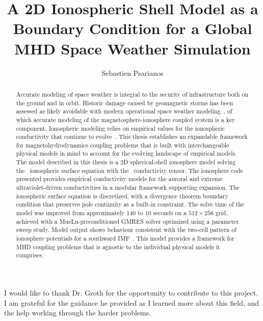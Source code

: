 \documentclass{ut-thesis-custom}
\author{Sebastien Psarianos}
\title{A 2D Ionospheric Shell Model as a Boundary Condition
       for a Global MHD Space Weather Simulation}
\begin{document}
\frontmatter
\maketitle
\begin{abstract}

	Accurate modeling of space weather is integral to the security of infrastructure both on the ground and in orbit. Historic damage caused by geomagnetic storms has been assessed as likely avoidable with modern operational space weather modeling~\cite{economic_eastwood_2017}, of which accurate modeling of the magnetosphere-ionosphere coupled system is a key component. Ionospheric modeling relies on empirical values for the ionospheric conductivity that continue to evolve~\citep{cousins2015, moen1993, hardy1987}. This thesis establishes an expandable framework for magnetohydrodynamics coupling problems that is built with interchangeable physical models in mind to account for the evolving landscape of empirical models. The model described in this thesis is a 2D spherical-shell ionosphere model solving the~\citet{goodman1995} ionospheric surface equation with the~\citet{amm1996} conductivity tensor. The ionosphere code presented provides empirical conductivity models for the auroral and extreme ultraviolet-driven conductivities in a modular framework supporting expansion. The ionospheric surface equation is discretized, with a divergence theorem boundary condition that preserves pole continuity as a built-in constraint. The solve time of the model was improved from approximately 140 to 10 seconds on a $512\times256$ grid, achieved with a MueLu-preconditioned GMRES solver optimized using a parameter sweep study. Model output shows behaviour consistent with the two-cell pattern of ionosphere potentials for a southward IMF~\cite{kelley2009}. This model provides a framework for MHD coupling problems that is agnostic to the individual physical models it comprises.
\end{abstract}

\begin{acknowledgements}
	I would like to thank Dr. Groth for the opportunity to contribute to this project. I am grateful for the guidance he provided as I learned more about this field, and the help working through the harder problems.
\end{acknowledgements}

\tableofcontents
\listoffigures
\listoftables

\mainmatter







\appendix



\end{document}
